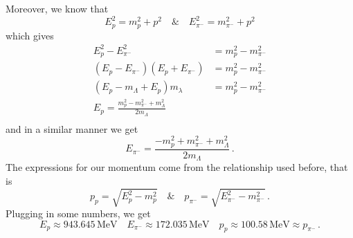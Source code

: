 \documentclass[10pt]{article}
\begin{document}
Moreover, we know that
\[ E_{p}^{2} = m_{p}^{2} + p^{2} \quad \& \quad E_{\pi^{-}}^{2} = m_{\pi^{-}}^{2} + p^{2} \]
which gives
\begin{equation*}
  \begin{split}
    E_{p}^{2} - E_{\pi^{-}}^{2} & = m_{p}^{2} - m_{\pi^{-}}^{2} \\
    (E_{p} - E_{\pi^{-}})(E_{p} + E_{\pi^{-}}) & =  m_{p}^{2} - m_{\pi^{-}}^{2} \\
    (E_{p} - m_{\Lambda} + E_{p})m_{\lambda} & = m_{p}^{2} - m_{\pi^{-}}^{2} \\
    E_{p} = \frac{m_{p}^{2} - m_{\pi^{-}}^{2} + m_{\Lambda}^{2}}{2m_{\Lambda}} \\
  \end{split}
\end{equation*}
and in a similar manner we get
\[ E_{\pi^{-}} = \frac{- m_{p}^{2} + m_{\pi^{-}}^{2} + m_{\Lambda}^{2}}{2m_{\Lambda}} \, .\]
The expressions for our momentum come from the relationship used before, that is
\[ p_{p} = \sqrt{E_{p}^{2} - m_{p}^{2}} \quad \& \quad p_{\pi^{-}} = \sqrt{E_{\pi^{-}}^{2} - m_{\pi^{-}}^{2}}\, . \]
Plugging in some numbers, we get
\[ E_{p} \approx 943.645 \,\text{MeV} \quad E_{\pi^{-}} \approx 172.035 \, \text{MeV} \quad p_{p} \approx 100.58 \,\text{MeV} \approx p_{\pi^{-}} \, .\]
\end{document}
